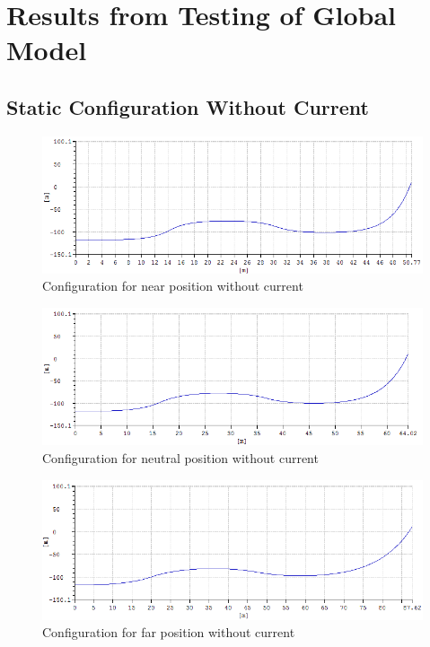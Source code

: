\chapter{Results from Testing of Global Model}
\label{appendix:A}
\section{Static Configuration Without Current}

\begin{figure}[H]
\centering
\includegraphics[scale=0.5]{figures/confignear}
\caption[$\; \:$Configuration for near position without current]{Configuration for near position without current}
 \label{fig:confignear}
\end{figure}

\begin{figure}[H]
\centering
\includegraphics[scale=0.5]{figures/configneu}
\caption[$\; \:$Configuration for neutral position without current]{Configuration for neutral position without current}
 \label{fig:configneu}
\end{figure}

\begin{figure}[H]
\centering
\includegraphics[scale=0.5]{figures/configfar}
\caption[$\; \:$Configuration for far position without current]{Configuration for far position without current}
 \label{fig:configfar}
\end{figure}

